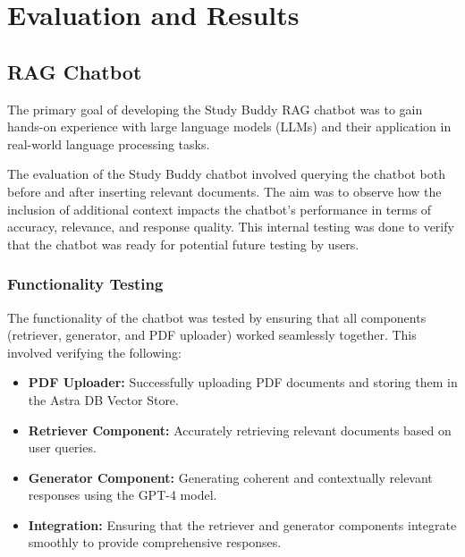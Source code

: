 \chapter{Evaluation and Results}

\section{RAG Chatbot}
The primary goal of developing the Study Buddy RAG chatbot was to gain hands-on experience with large language models (LLMs) and their application in real-world language processing tasks. %

The evaluation of the Study Buddy chatbot involved querying the chatbot both before and after inserting relevant documents. The aim was to observe how the inclusion of additional context impacts the chatbot's performance in terms of accuracy, relevance, and response quality. This internal testing was done to verify that the chatbot was ready for potential future testing by users.

\subsection{Functionality Testing}
The functionality of the chatbot was tested by ensuring that all components (retriever, generator, and PDF uploader) worked seamlessly together. This involved verifying the following:

\begin{itemize}
    \item \textbf{PDF Uploader:} Successfully uploading PDF documents and storing them in the Astra DB Vector Store.
    \item \textbf{Retriever Component:} Accurately retrieving relevant documents based on user queries.
    \item \textbf{Generator Component:} Generating coherent and contextually relevant responses using the GPT-4 model.
    \item \textbf{Integration:} Ensuring that the retriever and generator components integrate smoothly to provide comprehensive responses.
\end{itemize}


